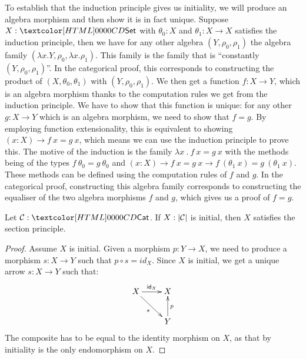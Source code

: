 To establish that the induction principle gives us initiality, we will
produce an algebra morphism and then show it is in fact
unique. Suppose $X : \Set$ with $\theta_0 : X$ and
$\theta_1 : X \to X$ satisfies the induction principle, then we have
for any other algebra $(Y,\rho_0,\rho_1)$ the algebra family
$(\lambda x . Y, \rho_0, \lambda x . \rho_1)$. This family is the
family that is ``constantly $(Y,\rho_0,\rho_1)$''. In the categorical
proof, this corresponds to constructing the product of
$(X,\theta_0,\theta_1)$ with $(Y,\rho_0,\rho_1)$. We then get a
function $f : X \to Y$, which is an algebra morphism thanks to the
computation rules we get from the induction principle. We have to show
that this function is unique: for any other $g : X \to Y$ which is an
algebra morphism, we need to show that $f = g$. By employing function
extensionality, this is equivalent to showing
$(x : X) \to f\ x = g\ x$, which means we can use the induction
principle to prove this. The motive of the induction is the family
$\lambda x\ .\ f\ x = g\ x$ with the methods being of the types
$f\ \theta_0 = g\ \theta_0$ and
$(x : X) \to f\ x = g\ x \to f\ (\theta_1\ x) = g\ (\theta_1\ x)$.
These methods can be defined using the computation rules of $f$ and
$g$. In the categorical proof, constructing this algebra family
corresponds to constructing the equaliser of the two algebra morphisms
$f$ and $g$, which gives us a proof of $f = g$.

\begin{lemma}
  \label{initiality-to-section}
  Let $\Cc: \Cat$. If $X : | \mathcal{C} |$ is initial, then $X$ satisfies the
  section principle.
\end{lemma}
\begin{proof}
  Assume $X$ is initial. Given a morphism $p : Y \to X$, we need to
  produce a morphism $s : X \to Y$ such that $p \circ s = id_X$.
  Since $X$ is initial, we get a unique arrow $s : X \to Y$ such that:
  $$
  \xymatrix{
    X \ar[r]^{\id_{X}} \ar[rd]_{s} &X \\
    &Y \ar[u]_{p}
  }
  $$
  The composite has to be equal to the identity morphism on $X$, as
  that by initiality is the only endomorphism on $X$.
\end{proof}

